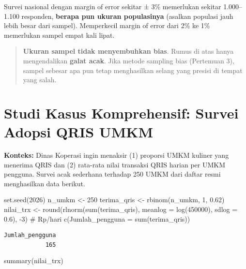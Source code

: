 \documentclass[
  indonesian,
  letterpaper,
]{book}
\newenvironment{Shaded}{\begin{snugshade}}{\end{snugshade}}
\newcommand{\AttributeTok}[1]{\textcolor[rgb]{0.40,0.45,0.13}{#1}}
\newcommand{\CommentTok}[1]{\textcolor[rgb]{0.37,0.37,0.37}{#1}}
\newcommand{\DecValTok}[1]{\textcolor[rgb]{0.68,0.00,0.00}{#1}}
\newcommand{\FloatTok}[1]{\textcolor[rgb]{0.68,0.00,0.00}{#1}}
\newcommand{\FunctionTok}[1]{\textcolor[rgb]{0.28,0.35,0.67}{#1}}
\newcommand{\NormalTok}[1]{\textcolor[rgb]{0.00,0.23,0.31}{#1}}
\newcommand{\OtherTok}[1]{\textcolor[rgb]{0.00,0.23,0.31}{#1}}
\newcommand{\SpecialCharTok}[1]{\textcolor[rgb]{0.37,0.37,0.37}{#1}}
\begin{document}
Survei nasional dengan margin of error sekitar ± 3\% memerlukan sekitar
1.000--1.100 responden, \textbf{berapa pun ukuran populasinya} (asalkan
populasi jauh lebih besar dari sampel). Memperkecil margin of error dari
2\% ke 1\% memerlukan sampel empat kali lipat.

\begin{quote}
\textbf{Ukuran sampel tidak menyembuhkan bias}. Rumus di atas hanya
mengendalikan \textbf{galat acak}. Jika metode sampling bias (Pertemuan
3), sampel sebesar apa pun tetap menghasilkan selang yang presisi di
tempat yang salah.
\end{quote}


\chapter{Studi Kasus Komprehensif: Survei Adopsi QRIS
UMKM}\label{studi-kasus-komprehensif-survei-adopsi-qris-umkm}

\textbf{Konteks:} Dinas Koperasi ingin menaksir (1) proporsi UMKM
kuliner yang menerima QRIS dan (2) rata-rata nilai transaksi QRIS harian
per UMKM pengguna. Survei acak sederhana terhadap 250 UMKM dari daftar
resmi menghasilkan data berikut.

\begin{Shaded}
\begin{Highlighting}[]
\FunctionTok{set.seed}\NormalTok{(}\DecValTok{2026}\NormalTok{)}
\NormalTok{n\_umkm }\OtherTok{\textless{}{-}} \DecValTok{250}
\NormalTok{terima\_qris }\OtherTok{\textless{}{-}} \FunctionTok{rbinom}\NormalTok{(n\_umkm, }\DecValTok{1}\NormalTok{, }\FloatTok{0.62}\NormalTok{)}
\NormalTok{nilai\_trx }\OtherTok{\textless{}{-}} \FunctionTok{round}\NormalTok{(}\FunctionTok{rlnorm}\NormalTok{(}\FunctionTok{sum}\NormalTok{(terima\_qris), }\AttributeTok{meanlog =} \FunctionTok{log}\NormalTok{(}\DecValTok{450000}\NormalTok{), }\AttributeTok{sdlog =} \FloatTok{0.6}\NormalTok{), }\SpecialCharTok{{-}}\DecValTok{3}\NormalTok{) }\CommentTok{\# Rp/hari}
\FunctionTok{c}\NormalTok{(}\AttributeTok{Jumlah\_pengguna =} \FunctionTok{sum}\NormalTok{(terima\_qris))}
\end{Highlighting}
\end{Shaded}

\begin{verbatim}
Jumlah_pengguna 
            165 
\end{verbatim}

\begin{Shaded}
\begin{Highlighting}[]
\FunctionTok{summary}\NormalTok{(nilai\_trx)}
\end{Highlighting}
\end{Shaded}
\end{document}
